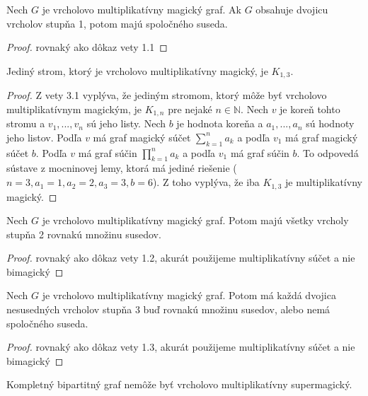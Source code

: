 \begin{subtheorem} Nech $G$ je vrcholovo multiplikatívny magický graf. Ak $G$ obsahuje dvojicu vrcholov stupňa 1, potom majú spoločného suseda.
\end{subtheorem}

\begin{proof} rovnaký ako dôkaz vety 1.1
\end{proof}

\begin{subconsequence} Jediný strom, ktorý je vrcholovo multiplikatívny magický, je $K_{1,3}$.
\end{subconsequence}

\begin{proof} Z vety 3.1 vyplýva, že jediným stromom, ktorý môže byť vrcholovo multiplikatívnym magickým, je $K_{1,n}$ pre nejaké $n \in \mathbb{N}$. Nech $v$ je koreň tohto stromu a $v_1, ... , v_n$ sú jeho listy. Nech $b$ je hodnota koreňa a $a_1, ... , a_n$ sú hodnoty jeho listov. Podľa $v$ má graf magický súčet $\sum_{k=1}^{n} a_k$ a podľa $v_1$ má graf magický súčet $b$. Podľa $v$ má graf súčin $\prod_{k=1}^{n} a_k$ a podľa $v_1$ má graf súčin $b$. To odpovedá sústave z mocninovej lemy, ktorá má jediné riešenie ($n = 3, a_1 = 1, a_2 = 2, a_3 = 3, b = 6$). Z toho vyplýva, že iba $K_{1,3}$ je multiplikatívny magický.
\end{proof}

\begin{subtheorem} Nech $G$ je vrcholovo multiplikatívny magický graf. Potom majú všetky vrcholy stupňa 2 rovnakú množinu susedov.
\end{subtheorem}

\begin{proof} rovnaký ako dôkaz vety 1.2, akurát použijeme multiplikatívny súčet a nie bimagický
\end{proof}

\begin{subtheorem} Nech $G$ je vrcholovo multiplikatívny magický graf. Potom má každá dvojica nesusedných vrcholov stupňa 3 buď rovnakú množinu susedov, alebo nemá spoločného suseda.
\end{subtheorem}

\begin{proof} rovnaký ako dôkaz vety 1.3, akurát použijeme multiplikatívny súčet a nie bimagický
\end{proof}

\begin{subtheorem} Kompletný bipartitný graf nemôže byť vrcholovo multiplikatívny supermagický.
\end{subtheorem}

